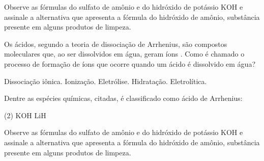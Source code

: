 \documentclass[11pt]{scrartcl}
\begin{document}
\begin{exercise}[points=1]
Observe as fórmulas do sulfato de amônio  e do hidróxido de potássio
KOH e assinale a alternativa que apresenta a fórmula do hidróxido de amônio, substância presente
em alguns produtos de limpeza.


\begin{choice}
\choice  {}
\choice {}
\choice {}
\choice {}
\choice {}
\end{choice}
\end{exercise}



\begin{exercise}[points=1]
Os ácidos, segundo a teoria de dissociação de Arrhenius, são compostos moleculares
que, ao ser dissolvidos em água, geram íons  . Como é chamado o processo de
formação de íons que ocorre quando um ácido é dissolvido em água?

\begin{choice}
\choice Dissociação iônica.
\choice Ionização.
\choice Eletrólise.
\choice Hidratação.
\choice Eletrolítica.
\end{choice}
\end{exercise}




\begin{exercise}[points=1.0]
Dentre as espécies químicas, citadas, é classificado como ácido de Arrhenius:

\begin{choice}(2)
\choice {}
\choice KOH
\choice {}
\choice {}
\choice LiH
\end{choice}
\end{exercise}












\begin{exercise}[points=1]
Observe as fórmulas do sulfato de amônio  e do hidróxido de potássio
KOH e assinale a alternativa que apresenta a fórmula do hidróxido de amônio, substância presente
em alguns produtos de limpeza.


\begin{choice}
\choice  {}
\choice {}
\choice {}
\choice {}
\choice {}
\end{choice}
\end{exercise}
\end{document}
